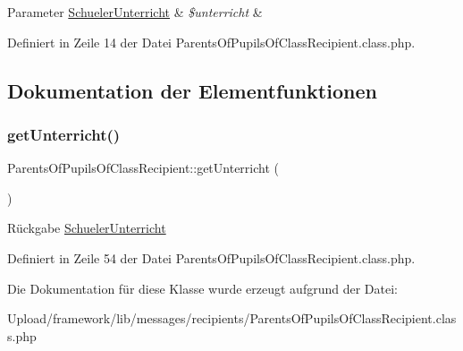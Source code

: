 \begin{DoxyParams}[1]{Parameter}
\mbox{\hyperlink{class_schueler_unterricht}{Schueler\+Unterricht}} & {\em \$unterricht} & \\
\hline
\end{DoxyParams}


Definiert in Zeile 14 der Datei Parents\+Of\+Pupils\+Of\+Class\+Recipient.\+class.\+php.



\subsection{Dokumentation der Elementfunktionen}
\mbox{\label{class_parents_of_pupils_of_class_recipient_a9377b6062bc48eccbed82589b3173825}} 
\subsubsection{\texorpdfstring{get\+Unterricht()}{getUnterricht()}}
{\footnotesize\ttfamily Parents\+Of\+Pupils\+Of\+Class\+Recipient\+::get\+Unterricht (\begin{DoxyParamCaption}{ }\end{DoxyParamCaption})}

\begin{DoxyReturn}{Rückgabe}
\mbox{\hyperlink{class_schueler_unterricht}{Schueler\+Unterricht}} 
\end{DoxyReturn}


Definiert in Zeile 54 der Datei Parents\+Of\+Pupils\+Of\+Class\+Recipient.\+class.\+php.



Die Dokumentation für diese Klasse wurde erzeugt aufgrund der Datei\+:\begin{DoxyCompactItemize}
\item 
Upload/framework/lib/messages/recipients/Parents\+Of\+Pupils\+Of\+Class\+Recipient.\+class.\+php\end{DoxyCompactItemize}
